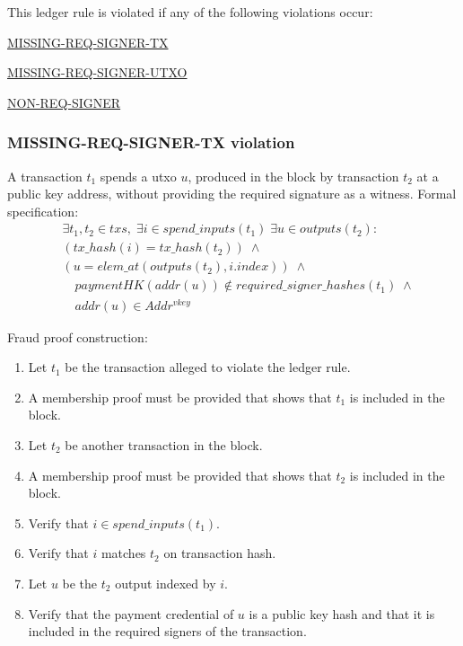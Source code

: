 \documentclass[../midgard.tex]{subfiles}
\begin{document}
This ledger rule is violated if any of the following violations occur:
\begin{itemize-multi}
  \item \hyperref[violation:MISSING-REQ-SIGNER-TX]{MISSING-REQ-SIGNER-TX}
  \item \hyperref[violation:MISSING-REQ-SIGNER-UTXO]{MISSING-REQ-SIGNER-UTXO}
  \item \hyperref[violation:NON-REQ-SIGNER]{NON-REQ-SIGNER}
\end{itemize-multi}

\subsubsection{MISSING-REQ-SIGNER-TX violation}
\label{violation:MISSING-REQ-SIGNER-TX}
A transaction $t_1$ spends a utxo $u$, produced in the block by transaction $t_2$ at a public key address, without providing the required signature as a witness.
Formal specification:
\begin{equation*}
\begin{split}
  &\exists t_1, t_2 \in txs,\; \exists i \in spend\_inputs(t_1)\; \exists u \in outputs(t_2) : \\
    &(tx\_hash(i) = tx\_hash(t_2)) \;\land\\
    &(u = elem\_at(outputs(t_2), i.index)) \;\land\\
    &\quad paymentHK(addr(u)) \notin required\_signer\_hashes(t_1) \;\land\\
    &\quad addr(u) \in Addr^{vkey}
\end{split}
\end{equation*}

Fraud proof construction:
\begin{enumerate}
  \item Let $t_1$ be the transaction alleged to violate the ledger rule.
  \item A membership proof must be provided that shows that $t_1$ is included in the block.
  \item Let $t_2$ be another transaction in the block.
  \item A membership proof must be provided that shows that $t_2$ is included in the block.
  \item Verify that $i \in spend\_inputs(t_1)$.
  \item Verify that $i$ matches $t_2$ on transaction hash. 
  \item Let $u$ be the $t_2$ output indexed by $i$. 
  \item Verify that the payment credential of $u$ is a public key hash and that it is included in the required signers of the transaction.
\end{enumerate}
\end{document}
